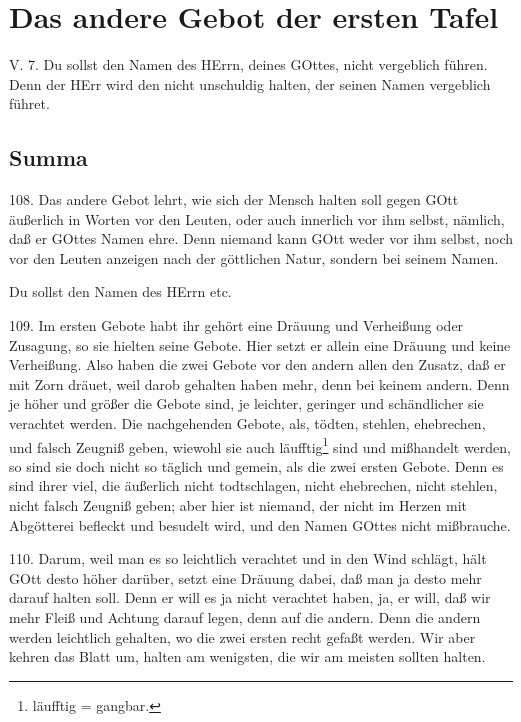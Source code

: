 \section{Das andere Gebot der ersten Tafel}

\begin{schriftzitat}
V. 7. Du sollst den Namen des HErrn, deines GOttes, nicht vergeblich führen. Denn der HErr wird den nicht unschuldig halten, der seinen Namen vergeblich führet.
\end{schriftzitat}

\subsection{Summa}

108. Das andere Gebot lehrt, wie sich der Mensch halten soll gegen GOtt äußerlich in Worten vor den Leuten, oder auch innerlich vor ihm selbst, nämlich, daß er GOttes Namen ehre. Denn niemand kann GOtt weder vor ihm selbst, noch vor den Leuten anzeigen nach der göttlichen Natur, sondern bei seinem Namen.

\begin{schriftzitat}
Du sollst den Namen des HErrn etc.
\end{schriftzitat}

109. Im ersten Gebote habt ihr gehört eine Dräuung und Verheißung oder Zusagung, so sie hielten seine Gebote. Hier setzt er allein eine Dräuung und keine Verheißung. Also haben die zwei Gebote vor den andern allen den Zusatz, daß er mit Zorn dräuet, weil darob gehalten haben mehr, denn bei keinem andern. Denn je höher und größer die Gebote sind, je leichter, geringer und schändlicher sie verachtet werden. Die nachgehenden Gebote, als, tödten, stehlen, ehebrechen, und falsch Zeugniß geben, wiewohl sie auch läufftig\footnote{läufftig = gangbar.} sind und mißhandelt werden, so sind sie doch nicht so täglich und gemein, als die zwei ersten Gebote. Denn es sind ihrer viel, die äußerlich nicht todtschlagen, nicht ehebrechen, nicht stehlen, nicht falsch Zeugniß geben; aber hier ist niemand, der nicht im Herzen mit Abgötterei befleckt und besudelt wird, und den Namen GOttes nicht mißbrauche.

110. Darum, weil man es so leichtlich verachtet und in den Wind schlägt, hält GOtt desto höher darüber, setzt eine Dräuung dabei, daß man ja desto mehr darauf halten soll. Denn er will es ja nicht verachtet haben, ja, er will, daß wir mehr Fleiß und Achtung darauf legen, denn auf die andern. Denn die andern werden leichtlich gehalten, wo die zwei ersten recht gefaßt werden. Wir aber kehren das Blatt um, halten am wenigsten, die wir am meisten sollten halten.

